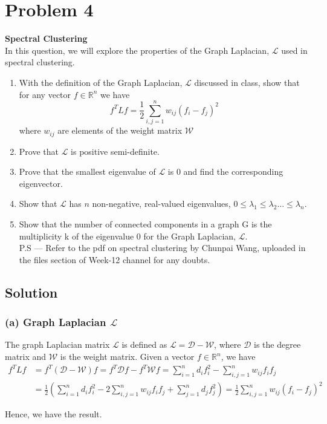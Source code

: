 \section*{Problem 4}

\textbf{Spectral Clustering}\\
In this question, we will explore the properties of the Graph Laplacian, \( \mathcal{L} \) used in spectral clustering.

\begin{enumerate}[label= (\alph*), noitemsep, topsep=0pt]
    \item With the definition of the Graph Laplacian, \( \mathcal{L} \) discussed in class, show that for any vector \( f \in \mathbb{R}^{n} \) we have
          \[
              f^{T} L f=\frac{1}{2} \sum_{i, j=1}^{n} w_{i j}\left(f_{i}-f_{j}\right)^{2}
          \]
          where \( w_{i j} \) are elements of the weight matrix \( \mathcal{W} \)

    \item Prove that \( \mathcal{L} \) is positive semi-definite.

    \item Prove that the smallest eigenvalue of \( \mathcal{L} \) is 0 and find the corresponding eigenvector.

    \item Show that \( \mathcal{L} \) has \( n \) non-negative, real-valued eigenvalues, \( 0 \leq \lambda_{1} \leq \lambda_{2} \ldots \leq \lambda_{n} \).

    \item Show that the number of connected components in a graph G is the multiplicity k of the eigenvalue 0 for the Graph Laplacian, \( \mathcal{L} \).\\
          P.S --- Refer to the pdf on spectral clustering by Chunpai Wang, uploaded in the files section of Week-12 channel for any doubts.
\end{enumerate}

\subsection*{Solution}

\subsubsection*{(a) Graph Laplacian \( \mathcal{L} \)}

The graph Laplacian matrix \( \mathcal{L} \) is defined as \( \mathcal{L} = \mathcal{D} - \mathcal{W} \), where \( \mathcal{D} \) is the degree matrix and \( \mathcal{W} \) is the weight matrix.
Given a vector \( f \in \mathbb{R}^{n} \), we have
\begin{align*}
    f^{T} L f
     & =
    f^{T} (\mathcal{D} - \mathcal{W}) f
    = f^{T} \mathcal{D} f - f^{T} \mathcal{W} f
    =
    \sum_{i=1}^{n} d_{i} f_{i}^{2} - \sum_{i, j=1}^{n} w_{i j} f_{i} f_{j}
    \\ & =
    \frac{1}{2} \left( \sum_{i=1}^{n} d_{i} f_{i}^{2} - 2 \sum_{i, j=1}^{n} w_{i j} f_{i} f_{j} + \sum_{j=1}^{n} d_{j} f_{j}^{2} \right)
    =
    \frac{1}{2} \sum_{i, j=1}^{n} w_{i j} (f_{i} - f_{j})^{2}
\end{align*}

Hence, we have the result.
